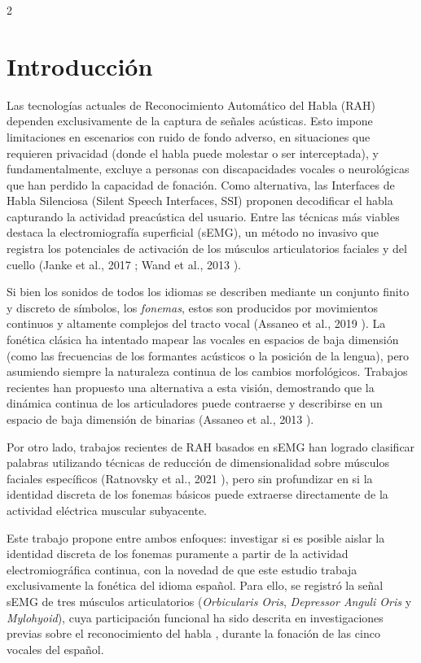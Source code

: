 \documentclass[11pt, letterpaper]{article}
\begin{document}
\vspace{7mm}

\begin{multicols*}{2}

\section{Introducción}
Las tecnologías actuales de Reconocimiento Automático del Habla (RAH) dependen exclusivamente de la captura de señales acústicas. Esto impone limitaciones en escenarios con ruido de fondo adverso, en situaciones que requieren privacidad (donde el habla puede molestar o ser interceptada), y fundamentalmente, excluye a personas con discapacidades vocales o neurológicas que han perdido la capacidad de fonación. Como alternativa, las Interfaces de Habla Silenciosa (Silent Speech Interfaces, SSI) proponen decodificar el habla capturando la actividad preacústica del usuario. Entre las técnicas más viables destaca la electromiografía superficial (sEMG), un método no invasivo que registra los potenciales de activación de los músculos articulatorios faciales y del cuello (Janke et al., 2017 \cite{janke2017}; Wand et al., 2013 \cite{wand2013}).

Si bien los sonidos de todos los idiomas se describen mediante un conjunto finito y discreto de símbolos, los \textit{fonemas}, estos son producidos por movimientos continuos y altamente complejos del tracto vocal (Assaneo et al., 2019 \cite{assaneo2019}). La fonética clásica ha intentado mapear las vocales en espacios de baja dimensión (como las frecuencias de los formantes acústicos o la posición de la lengua), pero asumiendo siempre la naturaleza continua de los cambios morfológicos. Trabajos recientes han propuesto una alternativa a esta visión, demostrando que la dinámica continua de los articuladores puede contraerse y describirse en un espacio de baja dimensión de  binarias (Assaneo et al., 2013 \cite{trevisan2013}).

Por otro lado, trabajos recientes de RAH basados en sEMG han logrado clasificar palabras utilizando técnicas de reducción de dimensionalidad sobre músculos faciales específicos (Ratnovsky et al., 2021 \cite{ratnovsky2021}), pero sin profundizar en si la identidad discreta de los fonemas básicos puede extraerse directamente de la actividad eléctrica muscular subyacente.

Este trabajo propone  entre ambos enfoques: investigar si es posible aislar la identidad discreta de los fonemas puramente a partir de la actividad electromiográfica continua, con la novedad de que este estudio trabaja exclusivamente la fonética del idioma español. Para ello, se registró la señal sEMG de tres músculos articulatorios (\textit{Orbicularis Oris}, \textit{Depressor Anguli Oris} y \textit{Mylohyoid}), cuya participación funcional ha sido descrita en investigaciones previas sobre el reconocimiento del habla \cite{ratnovsky2021, janke2017}, durante la fonación de las cinco vocales del español.


\end{multicols*}
\end{document}
